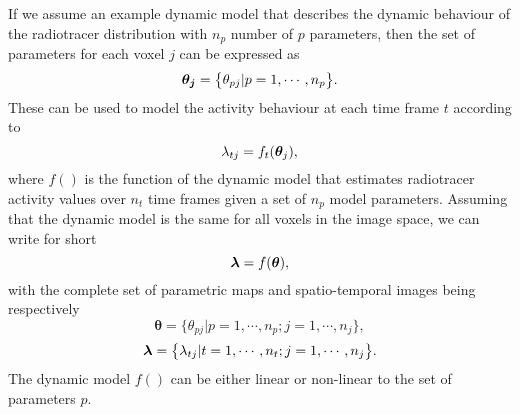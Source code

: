 If we assume an example dynamic model that describes the dynamic behaviour of the radiotracer distribution with $n_p$ number of $p$ parameters, then the set of parameters for each voxel $j$ can be expressed as
\begin{equation}
   \bm{\theta_j} = \big\{ {\theta_{pj}| p=1,\cdots,n_p} \big\} \\.
\end{equation}
These can be used to model the activity behaviour at each time frame $t$ according to
\begin{equation}
   \lambda_{tj} = f_{t}(\bm\theta_{j}) \\,
\label{eqn:LinearDynamicModel}
\end{equation}
where $f()$ is the function of the dynamic model that estimates radiotracer activity values over $n_t$ time frames given a set of $n_{p}$ model parameters.
Assuming that the dynamic model is the same for all voxels in the image space, we can write for short 
\begin{equation}
\bm\lambda = f(\bm\theta) \\, 
\end{equation}
with the complete set of parametric maps and spatio-temporal images being respectively
\begin{equation}
   \bm{\theta} = \big\{ {{\theta}_{pj}|p=1,\cdots,n_p ; j=1,\cdots,n_j} \big\} , 
\end{equation}
\begin{equation}
   \bm{\lambda} = \big\{ {{\lambda}_{tj}|t=1,\cdots,n_t ; j=1,\cdots,n_j} \big\} \\. 
\end{equation}
The dynamic model $f()$ can be either linear or non-linear to the set of parameters $p$. 
